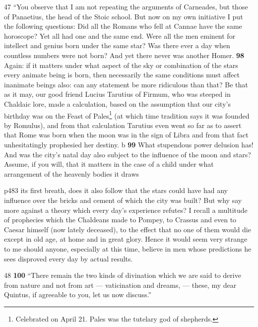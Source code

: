47
``You observe that I am not repeating the arguments of Carneades, but those of Panaetius, the head of the Stoic school. But now on my own initiative I put the following questions: Did all the Romans who fell at Cannae have the same horoscope? Yet all had one and the same end. Were all the men eminent for intellect and genius born under the same star? Was there ever a day when countless numbers were not born? And yet there never was another Homer. \textbf{98} Again: if it matters under what aspect of the sky or combination of the stars every animate being is born, then necessarily the same conditions must affect inanimate beings also: can any statement be more ridiculous than that? Be that as it may, our good friend Lucius Tarutius of Firmum, who was steeped in Chaldaic lore, made a calculation, based on the assumption that our city's birthday was on the Feast of Pales\texthebrew{}\footnote{Celebrated on April 21. Pales was the tutelary god of shepherds.

} (at which time tradition says it was founded by Romulus), and from that calculation Tarutius even went so far as to assert that Rome was born when the moon was in the sign of Libra and from that fact unhesitatingly prophesied her destiny.\texthebrew{} b \textbf{99} What stupendous power delusion has! And was the city's natal day also subject to the influence of the moon and stars? Assume, if you will, that it matters in the case of a child under what arrangement of the heavenly bodies it draws

p483 its first breath, does it also follow that the stars could have had any influence over the bricks and cement of which the city was built? But why say more against a theory which every day's experience refutes? I recall a multitude of prophecies which the Chaldeans made to Pompey, to Crassus and even to Caesar himself (now lately deceased), to the effect that no one of them would die except in old age, at home and in great glory. Hence it would seem very strange to me should anyone, especially at this time, believe in men whose predictions he sees disproved every day by actual results.

48
\textbf{100} ``There remain the two kinds of divination which we are said to derive from nature and not from art \texthebrew{—} vaticination and dreams, \texthebrew{—} these, my dear Quintus, if agreeable to you, let us now discuss.''

